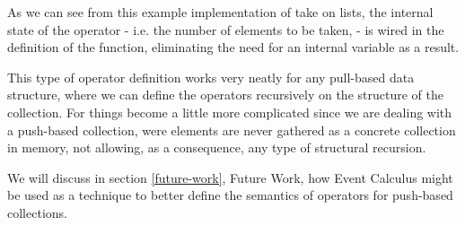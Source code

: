 As we can see from this example implementation of take on lists, the internal state of the operator - i.e. the number of elements to be taken,  - is wired in the definition of the function, eliminating the need for an internal variable as a result.

This type of operator definition works very neatly for any pull-based data structure, where we can define the operators recursively on the structure of the collection. For  things become a little more complicated since we are dealing with a push-based collection, were elements are never gathered as a concrete collection in memory, not allowing, as a consequence, any type of structural recursion.

We will discuss in section \ref{future-work}, Future Work, how Event Calculus might be used as a technique to better define the semantics of operators for push-based collections.